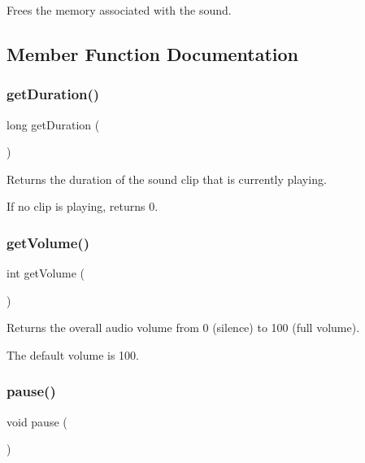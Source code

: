 Frees the memory associated with the sound. 



\subsection{Member Function Documentation}
\mbox{\label{classSound_affcaa1708a828c64648b58bd21223235}} 
\subsubsection{\texorpdfstring{get\+Duration()}{getDuration()}}
{\footnotesize\ttfamily long get\+Duration (\begin{DoxyParamCaption}{ }\end{DoxyParamCaption})\hspace{0.3cm}{\ttfamily [static]}}



Returns the duration of the sound clip that is currently playing. 

If no clip is playing, returns 0. \mbox{\label{classSound_aac9746ddc550ec176b0957affafbdbe7}} 
\subsubsection{\texorpdfstring{get\+Volume()}{getVolume()}}
{\footnotesize\ttfamily int get\+Volume (\begin{DoxyParamCaption}{ }\end{DoxyParamCaption})\hspace{0.3cm}{\ttfamily [static]}}



Returns the overall audio volume from 0 (silence) to 100 (full volume). 

The default volume is 100. \mbox{\label{classSound_a7167f5c196fc5e167bfabde1a730e81d}} 
\subsubsection{\texorpdfstring{pause()}{pause()}}
{\footnotesize\ttfamily void pause (\begin{DoxyParamCaption}{ }\end{DoxyParamCaption})\hspace{0.3cm}{\ttfamily [static]}}



